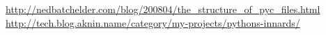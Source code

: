 \documentclass{article}
\begin{document}
\vspace{0.5cm}
\begin{footnotesize}
\begin{thebibliography}{}

\url{http://nedbatchelder.com/blog/200804/the_structure_of_pyc_files.html}
\url{http://tech.blog.aknin.name/category/my-projects/pythons-innards/}
\end{thebibliography}
\end{footnotesize}
\end{document}
